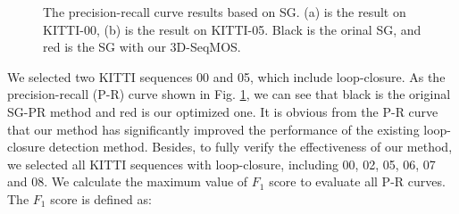\documentclass[lettersize,journal]{IEEEtran}
\begin{document}
\begin{figure}[h]
\begin{center}

\caption{The precision-recall curve results based on SG. (a) is the result on KITTI-00, (b) is the result on KITTI-05. Black is the orinal SG, and red is the SG with our 3D-SeqMOS.}
\label{fig12}
\end{center}
\end{figure}

We selected two KITTI sequences 00 and 05, which include loop-closure. As the precision-recall (P-R) curve shown in Fig. \ref{fig12}, we can see that black is the original SG-PR method and red is our optimized one. It is obvious from the P-R curve that our method has significantly improved the performance of the existing loop-closure detection method. Besides, to fully verify the effectiveness of our method, we selected all KITTI sequences with loop-closure, including 00, 02, 05, 06, 07 and 08. We calculate the maximum value of $F_1$ score to evaluate all P-R curves. The $F_1$ score is defined as:
\end{document}
